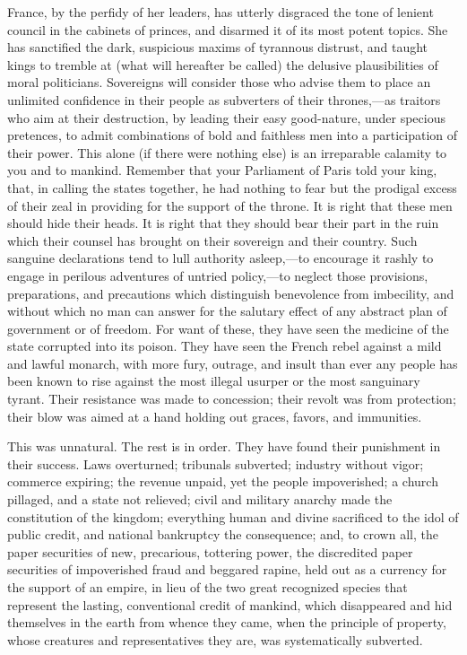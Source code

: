 France, by the perfidy of her leaders, has utterly disgraced the tone of lenient council in the cabinets of princes, and disarmed it of its most potent topics. She has sanctified the dark, suspicious maxims of tyrannous distrust, and taught kings to tremble at (what will hereafter be called) the delusive plausibilities of moral politicians. Sovereigns will consider those who advise them to place an unlimited confidence in their people as subverters of their thrones,—as traitors who aim at their destruction, by leading their easy good-nature, under specious pretences, to admit combinations of bold and faithless men into a participation of their power. This alone (if there were nothing else) is an irreparable calamity to you and to mankind. Remember that your Parliament of Paris told your king, that, in calling the states together, he had nothing to fear but the prodigal excess of their zeal in providing for the support of the throne. It is right that these men should hide their heads. It is right that they should bear their part in the ruin which their counsel has brought on their sovereign and their country. Such sanguine declarations tend to lull authority asleep,—to encourage it rashly to engage in perilous adventures of untried policy,—to neglect those provisions, preparations, and precautions which distinguish benevolence from imbecility, and without which no man can answer for the salutary effect of any abstract plan of government or of freedom. For want of these, they have seen the medicine of the state corrupted into its poison. They have seen the French rebel against a mild and lawful monarch, with more fury, outrage, and insult than ever any people has been known to rise against the most illegal usurper or the most sanguinary tyrant. Their resistance was made to concession; their revolt was from protection; their blow was aimed at a hand holding out graces, favors, and immunities.

This was unnatural. The rest is in order. They have found their punishment in their success. Laws overturned; tribunals subverted; industry without vigor; commerce expiring; the revenue unpaid, yet the people impoverished; a church pillaged, and a state not relieved; civil and military anarchy made the constitution of the kingdom; everything human and divine sacrificed to the idol of public credit, and national bankruptcy the consequence; and, to crown all, the paper securities of new, precarious, tottering power, the discredited paper securities of impoverished fraud and beggared rapine, held out as a currency for the support of an empire, in lieu of the two great recognized species that represent the lasting, conventional credit of mankind, which disappeared and hid themselves in the earth from whence they came, when the principle of property, whose creatures and representatives they are, was systematically subverted.

